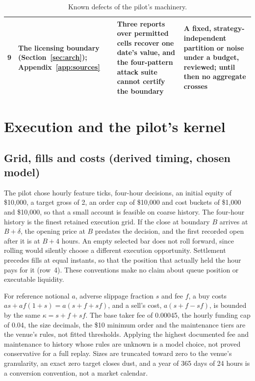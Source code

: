 \documentclass[11pt]{article}
\begin{document}
\begin{table}[ht]
\begin{tabularx}{\textwidth}{@{}l>{\raggedright\arraybackslash}p{3.1cm}>{\raggedright\arraybackslash}X>{\raggedright\arraybackslash}p{3.7cm}@{}}
9 & The licensing boundary (Section~\ref{sec:arch}); Appendix~\ref{app:sources} & Three reports over permitted cells recover one date's value, and the four-pattern attack suite cannot certify the boundary & A fixed, strategy-independent partition or noise under a budget, reviewed; until then no aggregate crosses \\
\bottomrule
\end{tabularx}
\caption{Known defects of the pilot's machinery.}
\label{tab:defects}
\end{table}

\section{Execution and the pilot's kernel}\label{app:engine}

\subsection{Grid, fills and costs (derived timing, chosen model)}\label{app:execution}

The pilot chose hourly feature ticks, four-hour decisions, an initial equity of \$10{,}000, a target gross of 2, an order cap of \$10{,}000 and cost buckets of \$1{,}000 and \$10{,}000, so that a small account is feasible on coarse history. The four-hour history is the finest retained execution grid. If the close at boundary $B$ arrives at $B+\delta$, the opening price at $B$ predates the decision, and the first recorded open after it is at $B+4$ hours. An empty selected bar does not roll forward, since rolling would silently choose a different execution opportunity. Settlement precedes fills at equal instants, so that the position that actually held the hour pays for it (row~4). These conventions make no claim about queue position or executable liquidity.

For reference notional $a$, adverse slippage fraction $s$ and fee $f$, a buy costs $as+af(1+s)=a(s+f+sf)$, and a sell's cost, $a(s+f-sf)$, is bounded by the same $\kappa=s+f+sf$. The base taker fee of 0.00045, the hourly funding cap of 0.04, the size decimals, the \$10 minimum order and the maintenance tiers are the venue's rules, not fitted thresholds. Applying the highest documented fee and maintenance to history whose rules are unknown is a model choice, not proved conservative for a full replay. Sizes are truncated toward zero to the venue's granularity, an exact zero target closes dust, and a year of 365 days of 24 hours is a conversion convention, not a market calendar.
\end{document}
